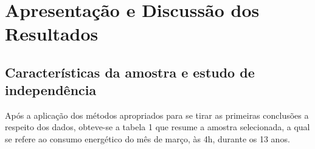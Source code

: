\documentclass[journal]{IEEEtran}
\begin{document}

    ~
    ~





%
%


\section{Apresentação e Discussão dos Resultados}
\subsection {Características da amostra e estudo de independência}
Após a aplicação dos métodos apropriados para se tirar as primeiras conclusões a respeito dos dados, obteve-se a tabela 1 que resume a amostra selecionada, a qual se refere ao consumo energético do mês de março, às 4h, durante os 13 anos.
\end{document}
